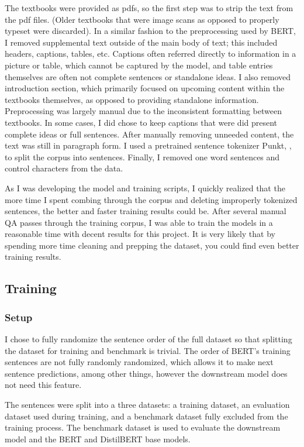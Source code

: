 \documentclass[11pt,a4paper]{article}
\begin{document}
The textbooks were provided as pdfs, so the first step was to strip the text from the pdf files. (Older textbooks that were image scans as opposed to properly typeset were discarded). In a similar fashion to the preprocessing used by BERT, I removed supplemental text outside of the main body of text; this included headers, captions, tables, etc. Captions often referred directly to information in a picture or table, which cannot be captured by the model, and table entries themselves are often not complete sentences or standalone ideas. I also removed introduction section, which primarily focused on upcoming content within the textbooks themselves, as opposed to providing standalone information. Preprocessing was largely manual due to the inconsistent formatting between textbooks. In some cases, I did chose to keep captions that were did present complete ideas or full sentences. After manually removing unneeded content, the text was still in paragraph form. I used a pretrained sentence tokenizer Punkt, \cite{Punkt}, to split the corpus into sentences. Finally, I removed one word sentences and control characters from the data.

As I was developing the model and training scripts, I quickly realized that the more time I spent combing through the corpus and deleting improperly tokenized sentences, the better and faster training results could be. After several manual QA passes through the training corpus, I was able to train the models in a reasonable time with decent results for this project. It is very likely that by spending more time cleaning and prepping the dataset, you could find even better training results.

\subsection{Training}

\subsubsection{Setup}

I chose to fully randomize the sentence order of the full dataset so that splitting the dataset for training and benchmark is trivial. The order of BERT's training sentences are not fully randomly randomized, which allows it to make next sentence predictions, among other things, however the downstream model does not need this feature.

The sentences were split into a three datasets: a training dataset, an evaluation dataset used during training, and a benchmark dataset fully excluded from the training process. The benchmark dataset is used to evaluate the downstream model and the BERT and DistilBERT base models.
\end{document}
